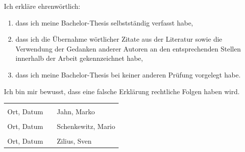 \documentclass[
	12pt, %
	a4paper,
	listof=totoc, %
	bibliography=totoc, %
	numbers=noenddot, %
	ngerman, %
	headsepline, %
	oneside %
	]{scrbook} %
\newcommand{\studentNameEins}{Jahn, Marko}
\newcommand{\studentNameZwei}{Schenkewitz, Mario}
\newcommand{\studentNameDrei}{Zilius, Sven}
\begin{document}
\thispagestyle{empty}

Ich erkläre ehrenwörtlich:
\begin{enumerate}
	\item dass ich meine Bachelor-Thesis selbstständig verfasst habe,
	\item dass ich die Übernahme wörtlicher Zitate aus der Literatur sowie die Verwendung der Gedanken anderer Autoren an den entsprechenden Stellen innerhalb der Arbeit gekennzeichnet habe,
	\item dass ich meine Bachelor-Thesis bei keiner anderen Prüfung vorgelegt habe.
\end{enumerate}
Ich bin mir bewusst, dass eine falsche Erklärung rechtliche Folgen haben wird.
\vspace{2cm}

\begin{tabular}{lp{4em}l} 
 \hspace{5cm}   && \hspace{6cm} \\\cline{1-1}\cline{3-3} 
 Ort, Datum     && \studentNameEins \\ [10ex]
 \hspace{5cm}   && \hspace{6cm} \\\cline{1-1}\cline{3-3} 
 Ort, Datum     && \studentNameZwei \\ [10ex]
 \hspace{5cm}   && \hspace{6cm} \\\cline{1-1}\cline{3-3} 
 Ort, Datum     && \studentNameDrei \\ [10ex]
\end{tabular}
\end{document}
